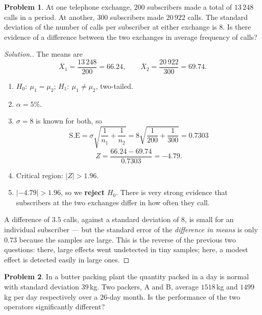 \documentclass[11pt,a4paper]{article}
\theoremstyle{definition}
\newtheorem{problemx}{Problem}[section]
\newenvironment{problem}{\begin{problemx}}{\end{problemx}}
\newenvironment{solution}
  {\renewcommand{\qedsymbol}{}\begin{proof}[\textit{Solution}.]}
  {\end{proof}}
\begin{document}
\begin{problem}
At one telephone exchange, $200$ subscribers made a total of $13\,248$ calls in a period. At
another, $300$ subscribers made $20\,922$ calls. The standard deviation of the number of
calls per subscriber at either exchange is $8$. Is there evidence of a difference between
the two exchanges in average frequency of calls?
\end{problem}

\begin{solution}
The means are
\[\overline{X}_1=\frac{13\,248}{200}=66.24,\qquad \overline{X}_2=\frac{20\,922}{300}=69.74.\]
\begin{enumerate}
\item $H_0:\ \mu_1=\mu_2$; $H_1:\ \mu_1\neq\mu_2$, two-tailed.
\item $\alpha=5\%$.
\item $\sigma=8$ is known for both, so
\[\text{S.E}=\sigma\sqrt{\frac{1}{n_1}+\frac{1}{n_2}}=8\sqrt{\frac{1}{200}+\frac{1}{300}}=0.7303\]
\[Z=\frac{66.24-69.74}{0.7303}=-4.79.\]
\item Critical region: $|Z|>1.96$.
\item $|-4.79|>1.96$, so we \textbf{reject} $H_0$. There is very strong evidence that
subscribers at the two exchanges differ in how often they call.
\end{enumerate}

A difference of $3.5$ calls, against a standard deviation of $8$, is small for an individual
subscriber --- but the standard error of the \emph{difference in means} is only $0.73$
because the samples are large. This is the reverse of the previous two questions: there,
large effects went undetected in tiny samples; here, a modest effect is detected easily in
large ones.
\end{solution}

\begin{problem}
In a butter packing plant the quantity packed in a day is normal with standard deviation
$39$\,kg. Two packers, A and B, average $1518$\,kg and $1499$\,kg per day respectively over
a $26$-day month. Is the performance of the two operators significantly different?
\end{problem}
\end{document}
